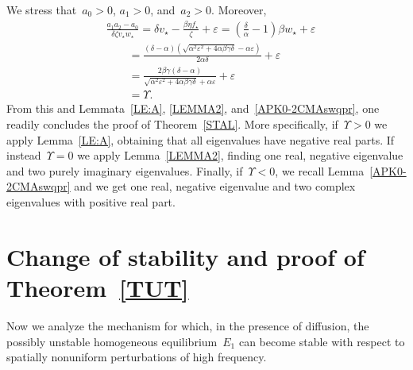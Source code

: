 \documentclass[12pt]{amsart}
\renewcommand{\epsilon}{\varepsilon}
\numberwithin{equation}{section}
\begin{document}
We stress that~$a_0>0$, $a_1>0$, and~$a_2>0$. Moreover,
\begin{equation}\label{0jdocwg-21rtghb:002}
\begin{split}&
\frac{a_1 a_2-a_0}{\delta\zeta v_\star w_\star}=
\delta  v_\star  -\frac{\beta \eta f_\star}\zeta   + \epsilon=
\left( \frac{ \delta}{\alpha}  -1\right)\beta w_\star + \epsilon\\&\qquad=
\frac{ \left(\delta-\alpha\right) \left(\sqrt{\alpha^2 \epsilon^2 + 4 \alpha \beta \gamma \delta} - \alpha \epsilon\right) }{2 \alpha\delta} + \epsilon\\&\qquad=
\frac{ 2\beta \gamma \left(\delta-\alpha\right) }{ \sqrt{\alpha^2 \epsilon^2 + 4 \alpha \beta \gamma \delta} + \alpha \epsilon} + \epsilon\\&\qquad=\Upsilon.
\end{split}\end{equation}
{F}rom this and Lemmata~\ref{LE:A}, \ref{LEMMA2}, and~\ref{APK0-2CMAswqpr}, one readily concludes the proof of Theorem~\ref{STAL}.
More specifically, if~$\Upsilon>0$ we apply
Lemma~\ref{LE:A}, obtaining that all eigenvalues have negative real parts.
If instead~$\Upsilon=0$ we apply
Lemma~\ref{LEMMA2}, finding one real, negative eigenvalue
and two purely imaginary eigenvalues.
Finally, if~$\Upsilon<0$, we recall Lemma~\ref{APK0-2CMAswqpr} and we get
one real, negative eigenvalue and two complex eigenvalues with positive real part.

\section{Change of stability and proof of Theorem~\ref{TUT}}\label{SEC:III}

Now we analyze the mechanism for which, in the presence of diffusion, the possibly unstable homogeneous equilibrium~$E_1$ can become stable with respect to spatially nonuniform perturbations
of high frequency.
\end{document}

